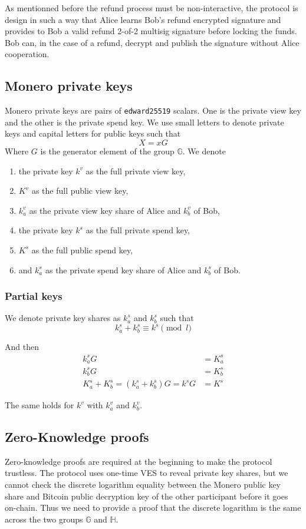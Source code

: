 \documentclass{llncs}
\newcommand{\GG}{\mathbb{G}}
\newcommand{\HH}{\mathbb{H}}
\begin{document}
As mentionned before the refund process must be non-interactive, the protocol is design in such a way that Alice learns Bob's refund encrypted signature and provides to Bob a valid refund 2-of-2 multisig signature before locking the funds. Bob can, in the case of a refund, decrypt and publish the signature without Alice cooperation.

\subsection{Monero private keys}
Monero private keys are pairs of \texttt{edward25519} scalars. One is the private view key and the other is the private spend key. We use small letters to denote private keys and capital letters for public keys such that
$$X = xG$$
Where $G$ is the generator element of the group $\GG$. We denote
\begin{enumerate}[label=(\roman*)]
    \item the private key $k^v$ as the full private view key,
    \item $K^v$ as the full public view key,
    \item $k^v_a$ as the private view key share of Alice and $k^v_b$ of Bob,
    \item the private key $k^s$ as the full private spend key,
    \item $K^s$ as the full public spend key,
    \item and $k^s_a$ as the private spend key share of Alice and $k^s_b$ of Bob.
\end{enumerate}

\subsubsection{Partial keys}
We denote private key shares as $k^s_a$ and $k^s_b$ such that
$$k^s_a + k^s_b \equiv k^s \pmod l$$

And then
\begin{equation}
\begin{split}
    k^s_aG &= K^s_a \\
    k^s_bG &= K^s_b \\
    K^s_a + K^s_b = (k^s_a + k^s_b)G = k^sG &= K^s
\end{split}
\end{equation}

The same holds for $k^v$ with $k^v_a$ and $k^v_b$.

\subsection{Zero-Knowledge proofs}
\label{eqDiscreteLog}
Zero-knowledge proofs are required at the beginning to make the protocol trustless. The protocol uses one-time VES to reveal private key shares, but we cannot check the discrete logarithm equality between the Monero public key share and Bitcoin public decryption key of the other participant before it goes on-chain. Thus we need to provide a proof that the discrete logarithm is the same across the two groups $\GG$ and $\HH$.
\end{document}
